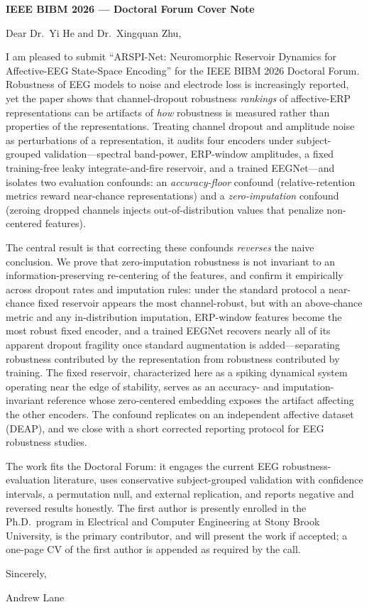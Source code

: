 \documentclass[11pt]{article}
\begin{document}
\begin{center}
{\large\textbf{IEEE BIBM 2026 --- Doctoral Forum Cover Note}}
\end{center}

\vspace{1em}

Dear Dr.\ Yi He and Dr.\ Xingquan Zhu,

I am pleased to submit ``ARSPI-Net: Neuromorphic Reservoir Dynamics for Affective-EEG State-Space Encoding'' for the IEEE BIBM 2026 Doctoral Forum. Robustness of EEG models to noise and electrode loss is increasingly reported, yet the paper shows that channel-dropout robustness \emph{rankings} of affective-ERP representations can be artifacts of \emph{how} robustness is measured rather than properties of the representations. Treating channel dropout and amplitude noise as perturbations of a representation, it audits four encoders under subject-grouped validation---spectral band-power, ERP-window amplitudes, a fixed training-free leaky integrate-and-fire reservoir, and a trained EEGNet---and isolates two evaluation confounds: an \emph{accuracy-floor} confound (relative-retention metrics reward near-chance representations) and a \emph{zero-imputation} confound (zeroing dropped channels injects out-of-distribution values that penalize non-centered features).

The central result is that correcting these confounds \emph{reverses} the naive conclusion. We prove that zero-imputation robustness is not invariant to an information-preserving re-centering of the features, and confirm it empirically across dropout rates and imputation rules: under the standard protocol a near-chance fixed reservoir appears the most channel-robust, but with an above-chance metric and any in-distribution imputation, ERP-window features become the most robust fixed encoder, and a trained EEGNet recovers nearly all of its apparent dropout fragility once standard augmentation is added---separating robustness contributed by the representation from robustness contributed by training. The fixed reservoir, characterized here as a spiking dynamical system operating near the edge of stability, serves as an accuracy- and imputation-invariant reference whose zero-centered embedding exposes the artifact affecting the other encoders. The confound replicates on an independent affective dataset (DEAP), and we close with a short corrected reporting protocol for EEG robustness studies.

The work fits the Doctoral Forum: it engages the current EEG robustness-evaluation literature, uses conservative subject-grouped validation with confidence intervals, a permutation null, and external replication, and reports negative and reversed results honestly. The first author is presently enrolled in the Ph.D.\ program in Electrical and Computer Engineering at Stony Brook University, is the primary contributor, and will present the work if accepted; a one-page CV of the first author is appended as required by the call.

\vspace{1em}

Sincerely,

Andrew Lane
\end{document}
